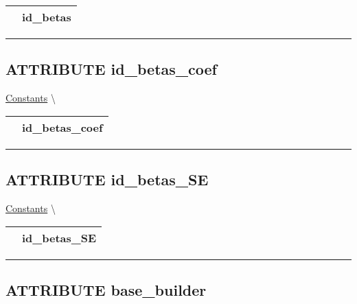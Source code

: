 {\renewcommand{\arraystretch}{1.5}
\begin{tabularx}{\textwidth}{|>{\raggedright\arraybackslash}l|X|}
\hline
\hspace{0pt}\mytexttt{\color{red} } & \textbf{id\_betas} \\
\hline
\end{tabularx}
}

\par


\rule{\linewidth}{0.5pt}
\subsection*{\textsf{\colorbox{headtoc}{\color{white} ATTRIBUTE}
id\_betas\_coef}}

\hypertarget{ecldoc:logisticregression.constants.id_betas_coef}{}
\hspace{0pt} \hyperlink{ecldoc:LogisticRegression.Constants}{Constants} \textbackslash 

{\renewcommand{\arraystretch}{1.5}
\begin{tabularx}{\textwidth}{|>{\raggedright\arraybackslash}l|X|}
\hline
\hspace{0pt}\mytexttt{\color{red} } & \textbf{id\_betas\_coef} \\
\hline
\end{tabularx}
}

\par


\rule{\linewidth}{0.5pt}
\subsection*{\textsf{\colorbox{headtoc}{\color{white} ATTRIBUTE}
id\_betas\_SE}}

\hypertarget{ecldoc:logisticregression.constants.id_betas_se}{}
\hspace{0pt} \hyperlink{ecldoc:LogisticRegression.Constants}{Constants} \textbackslash 

{\renewcommand{\arraystretch}{1.5}
\begin{tabularx}{\textwidth}{|>{\raggedright\arraybackslash}l|X|}
\hline
\hspace{0pt}\mytexttt{\color{red} } & \textbf{id\_betas\_SE} \\
\hline
\end{tabularx}
}

\par


\rule{\linewidth}{0.5pt}
\subsection*{\textsf{\colorbox{headtoc}{\color{white} ATTRIBUTE}
base\_builder}}


